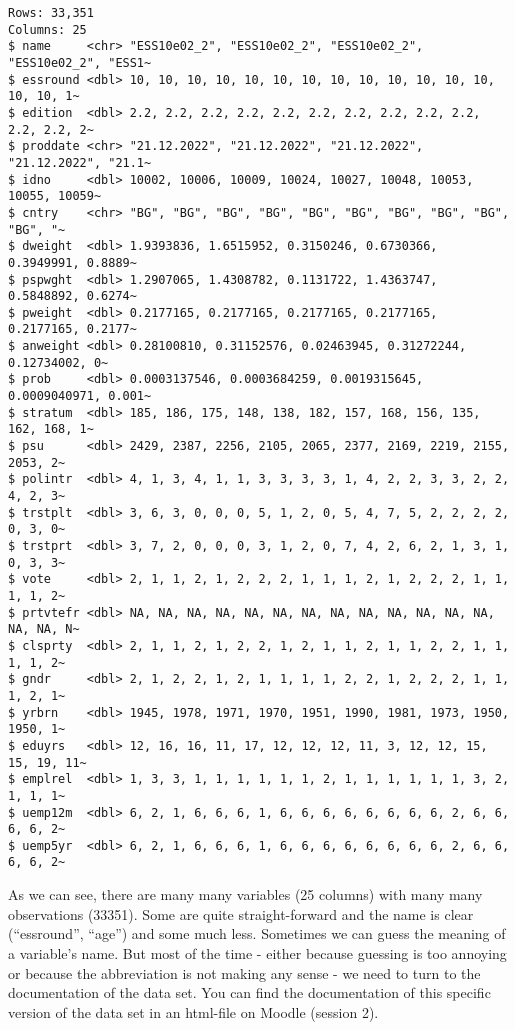 \documentclass[
  letterpaper,
  DIV=11,
  numbers=noendperiod]{scrreprt}
\begin{document}
\begin{verbatim}
Rows: 33,351
Columns: 25
$ name     <chr> "ESS10e02_2", "ESS10e02_2", "ESS10e02_2", "ESS10e02_2", "ESS1~
$ essround <dbl> 10, 10, 10, 10, 10, 10, 10, 10, 10, 10, 10, 10, 10, 10, 10, 1~
$ edition  <dbl> 2.2, 2.2, 2.2, 2.2, 2.2, 2.2, 2.2, 2.2, 2.2, 2.2, 2.2, 2.2, 2~
$ proddate <chr> "21.12.2022", "21.12.2022", "21.12.2022", "21.12.2022", "21.1~
$ idno     <dbl> 10002, 10006, 10009, 10024, 10027, 10048, 10053, 10055, 10059~
$ cntry    <chr> "BG", "BG", "BG", "BG", "BG", "BG", "BG", "BG", "BG", "BG", "~
$ dweight  <dbl> 1.9393836, 1.6515952, 0.3150246, 0.6730366, 0.3949991, 0.8889~
$ pspwght  <dbl> 1.2907065, 1.4308782, 0.1131722, 1.4363747, 0.5848892, 0.6274~
$ pweight  <dbl> 0.2177165, 0.2177165, 0.2177165, 0.2177165, 0.2177165, 0.2177~
$ anweight <dbl> 0.28100810, 0.31152576, 0.02463945, 0.31272244, 0.12734002, 0~
$ prob     <dbl> 0.0003137546, 0.0003684259, 0.0019315645, 0.0009040971, 0.001~
$ stratum  <dbl> 185, 186, 175, 148, 138, 182, 157, 168, 156, 135, 162, 168, 1~
$ psu      <dbl> 2429, 2387, 2256, 2105, 2065, 2377, 2169, 2219, 2155, 2053, 2~
$ polintr  <dbl> 4, 1, 3, 4, 1, 1, 3, 3, 3, 3, 1, 4, 2, 2, 3, 3, 2, 2, 4, 2, 3~
$ trstplt  <dbl> 3, 6, 3, 0, 0, 0, 5, 1, 2, 0, 5, 4, 7, 5, 2, 2, 2, 2, 0, 3, 0~
$ trstprt  <dbl> 3, 7, 2, 0, 0, 0, 3, 1, 2, 0, 7, 4, 2, 6, 2, 1, 3, 1, 0, 3, 3~
$ vote     <dbl> 2, 1, 1, 2, 1, 2, 2, 2, 1, 1, 1, 2, 1, 2, 2, 2, 1, 1, 1, 1, 2~
$ prtvtefr <dbl> NA, NA, NA, NA, NA, NA, NA, NA, NA, NA, NA, NA, NA, NA, NA, N~
$ clsprty  <dbl> 2, 1, 1, 2, 1, 2, 2, 1, 2, 1, 1, 2, 1, 1, 2, 2, 1, 1, 1, 1, 2~
$ gndr     <dbl> 2, 1, 2, 2, 1, 2, 1, 1, 1, 1, 2, 2, 1, 2, 2, 2, 1, 1, 1, 2, 1~
$ yrbrn    <dbl> 1945, 1978, 1971, 1970, 1951, 1990, 1981, 1973, 1950, 1950, 1~
$ eduyrs   <dbl> 12, 16, 16, 11, 17, 12, 12, 12, 11, 3, 12, 12, 15, 15, 19, 11~
$ emplrel  <dbl> 1, 3, 3, 1, 1, 1, 1, 1, 1, 2, 1, 1, 1, 1, 1, 1, 3, 2, 1, 1, 1~
$ uemp12m  <dbl> 6, 2, 1, 6, 6, 6, 1, 6, 6, 6, 6, 6, 6, 6, 6, 2, 6, 6, 6, 6, 2~
$ uemp5yr  <dbl> 6, 2, 1, 6, 6, 6, 1, 6, 6, 6, 6, 6, 6, 6, 6, 2, 6, 6, 6, 6, 2~
\end{verbatim}

As we can see, there are many many variables (25 columns) with many many
observations (33351). Some are quite straight-forward and the name is
clear (``essround'', ``age'') and some much less. Sometimes we can guess
the meaning of a variable's name. But most of the time - either because
guessing is too annoying or because the abbreviation is not making any
sense - we need to turn to the documentation of the data set. You can
find the documentation of this specific version of the data set in an
html-file on Moodle (session 2).
\end{document}
